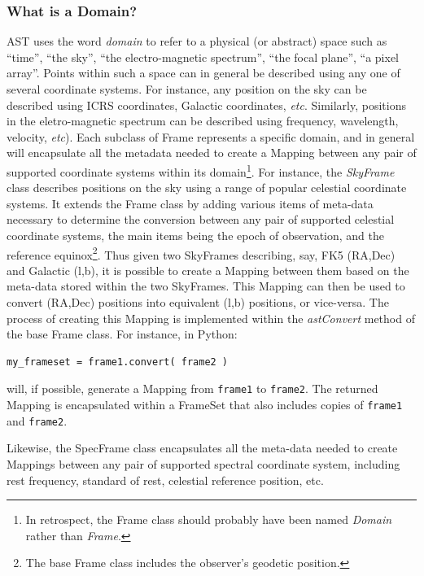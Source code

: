 \documentclass[final,authoryear,5p,times,twocolumn]{elsarticle}
\begin{document}
\subsubsection{What is a Domain?}
\label{sec:domain}
AST uses the word \emph{domain} to refer to a physical (or abstract)
space such as ``time'', ``the sky'', ``the electro-magnetic spectrum'',
``the focal plane'', ``a pixel array''. Points within such a space can in
general be described using any one of several coordinate systems. For
instance, any position on the sky can be described using ICRS
coordinates, Galactic coordinates, \emph{etc}. Similarly, positions in
the eletro-magnetic spectrum can be described using frequency,
wavelength, velocity, \emph{etc}). Each subclass of Frame represents a
specific domain, and in general will encapsulate all the metadata needed
to create a Mapping between any pair of supported coordinate systems
within its domain\footnote{In retrospect, the Frame
class should probably have been named \emph{Domain} rather than
\emph{Frame}.}. For instance, the \emph{SkyFrame} class describes positions
on the sky using a range of popular celestial coordinate systems. It extends
the Frame class by adding various items of meta-data necessary to
determine the conversion between any pair of supported celestial coordinate
systems, the main
items being the epoch of observation, and the reference
equinox\footnote{The base Frame class includes the observer's geodetic
position.}. Thus given two SkyFrames describing, say, FK5 (RA,Dec) and
Galactic (l,b), it is possible to create a Mapping between them based on
the meta-data stored within the two SkyFrames. This Mapping can then be
used to convert (RA,Dec) positions into equivalent (l,b) positions, or
vice-versa. The process of creating this Mapping is implemented within
the \emph{astConvert} method of the base Frame class. For instance, in
Python:

\begin{lstlisting}
my_frameset = frame1.convert( frame2 )
\end{lstlisting}

will, if possible, generate a Mapping from \texttt{frame1} to
\texttt{frame2}. The returned Mapping is encapsulated within a FrameSet that
also includes copies of \texttt{frame1} and \texttt{frame2}.

Likewise, the SpecFrame class encapsulates all the meta-data needed to
create Mappings between any pair of supported spectral coordinate system,
including rest frequency, standard of rest, celestial reference position,
etc.
\end{document}

